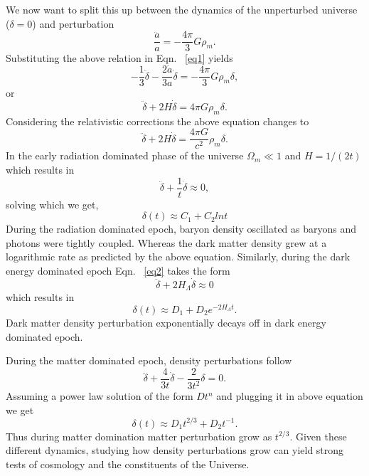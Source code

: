 We now want to split this up between the dynamics of the unperturbed universe ($\delta =0 $) and perturbation
\begin{equation}
\frac{\ddot{a}}{a}  = -\frac{4 \pi}{3} G\rho_{m}.
\end{equation}
Substituting the above relation in Eqn. ~\ref{eq1} yields 
\begin{equation}
- \frac{1}{3}\ddot{\delta} - \frac{2\dot{a}}{3a} \dot{\delta}  = -\frac{4 \pi}{3} G\rho_{m}\delta,
\end{equation}
or
\begin{equation}
\ddot{\delta} + 2 H\dot{\delta} = 4\pi G \rho_{m} \delta.
\end{equation}
Considering the relativistic corrections the above equation changes to 
\begin{equation}
\ddot{\delta} + 2 H \dot{\delta} = \frac{4\pi G}{c^{2}} \rho_{m} \delta.
\label{eq2}
\end{equation}
In the early radiation dominated phase of the universe $\Omega_{m} \ll 1$ and $H = 1/(2t)$ which results in 
\begin{equation}
\ddot{\delta} + \frac{1}{t} \dot{\delta} \approx 0,
\end{equation}
solving which we get,
\begin{equation}
\delta(t) \approx C_{1} + C_{2} lnt
\end{equation}
During the radiation dominated epoch, baryon density oscillated as baryons and photons were tightly coupled. 
Whereas the dark matter density grew at a logarithmic rate as predicted by the above equation.  
Similarly, during the dark energy dominated epoch Eqn. ~\ref{eq2} takes the form
\begin{equation}
\ddot{\delta} + 2 H_{\Lambda} \dot{\delta} \approx 0
\end{equation}
which results in
\begin{equation}
\delta(t) \approx D_{1} + D_{2}e^{-2H_{\Lambda} t}.
\end{equation}
Dark matter density perturbation exponentially decays off in dark energy dominated epoch. 


During the matter dominated epoch, density perturbations follow
\begin{equation}
\ddot{\delta} + \frac{4}{3t} \dot{\delta} -\frac{2}{3t^{2}} \delta = 0.
\end{equation}  
Assuming a power law solution of the form $Dt^{n}$  and plugging it in above equation we get
\begin{equation}
\delta(t) \approx D_{1} t^{2/3} + D_{2} t^{-1}.
\end{equation}
Thus during matter domination matter perturbation grow as $t^{2/3}$. Given these different dynamics, studying how density perturbations grow can yield strong tests of cosmology and the constituents of the Universe. 
